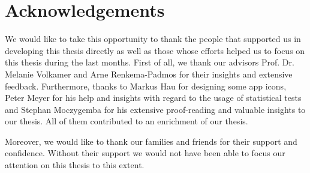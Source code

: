 \section*{Acknowledgements}

We would like to take this opportunity to thank the people that supported us in developing this thesis directly as well as those whose efforts helped us to focus on this thesis during the last months. First of all, we thank our advisors Prof. Dr. Melanie Volkamer and Arne Renkema-Padmos for their insights and extensive feedback.
Furthermore, thanks to Markus Hau for designing some app icons, Peter Meyer for his help and insights with regard to the usage of statistical tests and Stephan Moczygemba for his extensive proof-reading and valuable insights to our thesis. All of them contributed to an enrichment of our thesis.

Moreover, we would like to thank our families and friends for their support and confidence. Without their support we would not have been able to focus our attention on this thesis to this extent.